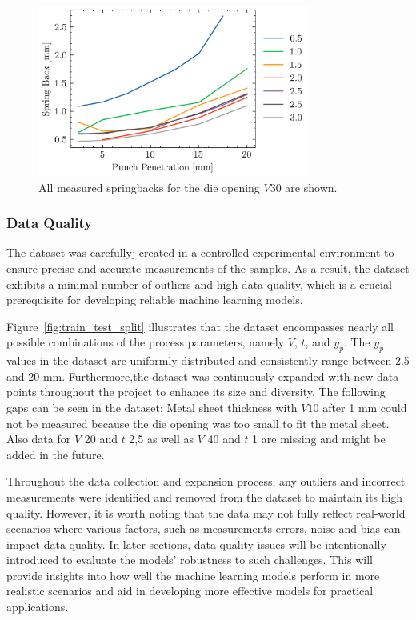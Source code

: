 \begin{figure}[h]
    \begin{tcolorbox}[arc=0pt,boxrule=0.5pt]
        \centering
        \includegraphics[width=0.8\textwidth]{chap4/images/all-springbacks-consolidated}
        \caption{All measured springbacks for the die opening $V30$ are shown. }
        \label{fig:v30_springbacks}
    \end{tcolorbox}
\end{figure}

\subsubsection{Data Quality}
The dataset was carefullyj created in a controlled experimental environment to ensure precise and accurate
measurements of the samples.
As a result, the dataset exhibits a minimal number of outliers and high data quality,
which is a crucial prerequisite for developing reliable machine learning models.

Figure~\ref{fig:train_test_split} illustrates that the dataset encompasses nearly all possible combinations of the
process parameters, namely $V$, $t$, and $y_p$.
The $y_p$ values in the dataset are uniformly distributed and consistently range between 2.5 and 20 mm.
Furthermore,the dataset was continuously expanded with new data points throughout the project to enhance its size and
diversity.
The following gaps can be seen in the dataset: Metal sheet thickness with $V10$  after 1 mm could not be measured
because the die opening was too small to fit the metal sheet.
Also data for $V$ 20 and $t$ 2,5 as well as $V$ 40 and $t$ 1 are missing and might be added in the future.

Throughout the data collection and expansion process, any outliers and incorrect measurements were identified and
removed from the dataset to maintain its high quality.
However, it is worth noting that the data may not fully reflect real-world scenarios where various factors, such as
measurements errors, noise and bias can impact data quality.
In later sections, data quality issues will be intentionally introduced to evaluate the models' robustness to such
challenges.
This will provide insights into how well the machine learning models perform in more realistic scenarios and aid in
developing more effective models for practical applications.


